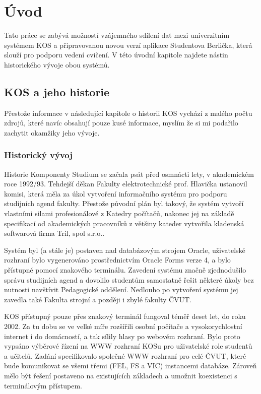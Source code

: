 \documentclass[11pt,twoside,a4paper]{book}
\begin{document}
\chapter{Úvod}

Tato práce se zabývá možností vzájemného sdílení dat mezi univerzitním systémem KOS a připravovanou novou verzí aplikace Studentova Berlička, která slouží pro podporu vedení cvičení. V této úvodní kapitole najdete nástin historického vývoje obou systémů.

\section{KOS a jeho historie}
Přestože informace v následující kapitole o historii KOS vychází z malého počtu zdrojů, které navíc obsahují pouze kusé informace, myslím že si mi podařilo zachytit okamžiky jeho vývoje.

\subsection{Historický vývoj}
Historie Komponenty Studium se začala psát před osmnácti lety, v akademickém roce 1992/93\cite{forum:historie-kos}. Tehdejší děkan Fakulty elektrotechnické prof. Hlavička ustanovil komisi, která měla za úkol vytvoření informačního systému pro podporu studijních agend fakulty. Přestože původní plán byl takový, že systém vytvoří vlastními silami profesionálové z Katedry počítačů, nakonec jej na základě specifikací od akademických pracovníků z většiny kateder vytvořila kladenská softwarová firma Tril, spol s.r.o.\cite{forum:neocekavana}.

Systém byl (a stále je) postaven nad databázovým strojem Oracle, uživatelské rozhraní bylo vygenerováno prostřednictvím Oracle Forms verze 4, a bylo přístupné pomocí znakového terminálu. Zavedení systému značně zjednodušilo správu studijních agend a dovolilo studentům samostatně řešit některé úkoly bez nutnosti navštívit Pedagogické oddělení. Nedlouho po vytvoření systému jej zavedla také Fakulta strojní a později i zbylé fakulty ČVUT.

KOS přístupný pouze přes znakový terminál fungoval téměř deset let, do roku 2002. Za tu dobu se ve velké míře rozšířili osobní počítače a vysokorychlostní internet i do domácností, a tak sílily hlasy po webovém rozhraní. Bylo proto vypsáno výběrové řízení na WWW rozhraní KOSu pro uživatelské role studentů a učitelů. Zadání specifikovalo společné WWW rozhraní pro celé ČVUT, které bude komunikovat se všemi třemi (FEL, FS a VIC) instancemi  databáze. Zároveň mělo být řešení postaveno na existujících základech a umožnit koexistenci s terminálovým přístupem. 
\end{document}
